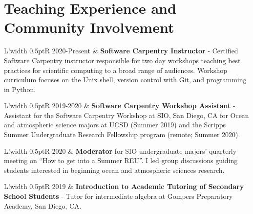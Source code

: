\documentclass[10pt]{article}
\newcommand\VRule{\color{lightgray}\vrule width 0.5pt}
\begin{document}
\section*{Teaching Experience and Community Involvement}
\vspace{.3cm}
\begin{tabular}{L!{\VRule}R}
2020-Present & \textbf{Software Carpentry Instructor} - Certified Software Carpentry instructor responsible for two day workshops teaching best practices for scientific computing to a broad range of audiences. Workshop curriculum focuses on the Unix shell, version control with Git, and programming in Python.  \\[5pt]
\end{tabular}
\newline \noindent
\newline \noindent 
\newline \noindent
\begin{tabular}{L!{\VRule}R}
2019-2020 & \textbf{Software Carpentry Workshop Assistant} - Assistant for the Software Carpentry Workshop at SIO, San Diego, CA for Ocean and atmospheric science majors at UCSD (Summer 2019) and the Scripps Summer Undergraduate Research Fellowship program (remote; Summer 2020). \\[5pt]
\end{tabular}
\newline \noindent
\newline \noindent 
\newline \noindent
\begin{tabular}{L!{\VRule}R}
2020 & \textbf{Moderator} for SIO undergraduate majors’ quarterly meeting on ``How to get into a Summer REU''. I led group discussions guiding students interested in beginning ocean and atmospheric sciences research. \\[5pt]
\end{tabular}
\newline \noindent
\newline \noindent 
\newline \noindent
\begin{tabular}{L!{\VRule}R}
2019 & \textbf{Introduction to Academic Tutoring of Secondary School Students} - Tutor for intermediate algebra at Gompers Preparatory Academy, San Diego, CA. \\[5pt]
\end{tabular}
\newline \noindent
\newline \noindent 
\newline \noindent
\end{document}
